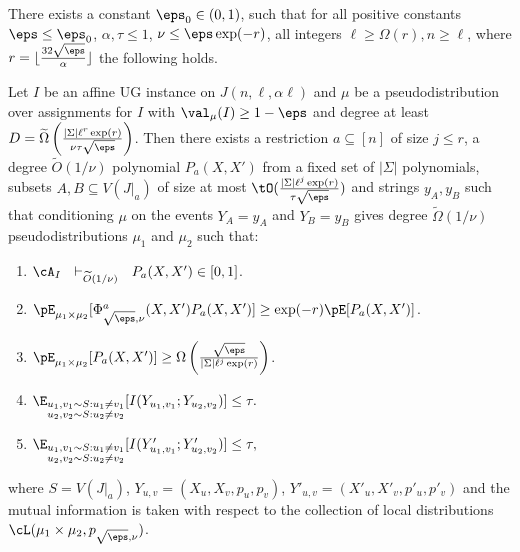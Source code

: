\begin{lemma}\label{lem:sp-j}
There exists a constant $\eps_0 \in (0,1)$, such that for all positive constants $\eps \leq \eps_0$, $\alpha, \tau \leq 1$, $\nu \leq \eps \exp(-r)$, all integers $\ell \geq \Omega(r), n \geq \ell$, where $r = \lfloor \frac{32\sqrt{\eps}}{\alpha}\rfloor$ the following holds. 

Let $I$ be an affine UG instance on $J(n,\ell,\alpha\ell)$ and $\mu$ be a pseudodistribution over assignments for $I$ with $\val_\mu(I) \geq 1-\eps$ and degree at least $D = \widetilde{\Omega}\left(\frac{|\Sigma|\ell^r\exp(r)}{\nu\tau\sqrt{\eps}}\right)$. Then there exists a restriction $a \subseteq [n]$ of size $j \leq r$, a degree $\widetilde{O}(1/\nu)$ polynomial $P_a(X,X')$ from a fixed set of $|\Sigma|$ polynomials, subsets $A, B \subseteq V(J|_a)$ of size at most $\tO(\frac{|\Sigma|\ell^j\exp(r)}{\tau\sqrt{\eps}})$ and strings $y_A, y_B$ such that conditioning $\mu$ on the events $Y_A = y_A$ and $Y_B = y_B$ gives degree $\widetilde{\Omega}(1/\nu)$ pseudodistributions $\mu_1$ and $\mu_2$ such that:
\begin{enumerate}
\item $\cA_I  ~~\vdash_{\widetilde{O}(1/\nu)} ~~ P_a(X,X') \in [0,1]$.
\item $\pE_{\mu_1 \times \mu_2}[\Phi^a_{\sqrt{\eps},\nu}(X,X')P_a(X,X')] \geq \exp(-r) \pE[P_a(X,X')]$.
\item $\pE_{\mu_1 \times \mu_2}[P_a(X,X')] \geq \Omega\left(\frac{\sqrt{\eps}}{|\Sigma|\ell^{j}\exp(r)}\right)$.
\item $\E_{\substack{u_1,v_1 \sim S: u_1 \neq v_1\\ u_2,v_2 \sim S: u_2 \neq v_2}}[I(Y_{u_1,v_1};Y_{u_2,v_2})] \leq \tau.$
\item $\E_{\substack{u_1,v_1 \sim S: u_1 \neq v_1\\ u_2,v_2 \sim S: u_2 \neq v_2}}[I(Y'_{u_1,v_1};Y'_{u_2,v_2})] \leq \tau,$
\end{enumerate}
where $S = V(J|_a)$, $Y_{u,v} = (X_u,X_v,p_u,p_v)$, $Y'_{u,v} = (X'_u,X'_v,p'_u,p'_v)$ and the mutual information is taken with respect to the collection of local distributions $\cL(\mu_1 \times \mu_2,p_{\sqrt{\eps},\nu})$. 
\end{lemma}

